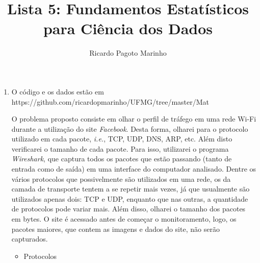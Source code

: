 \documentclass[11pt,a4paper]{book}
\title{Lista 5: Fundamentos Estatísticos para Ciência dos Dados}
\author{Ricardo Pagoto Marinho}
\begin{document}
\maketitle
	\begin{enumerate}
		\item

			O código e os dados estão em https://github.com/ricardopmarinho/UFMG/tree/master/Mat%
		
			O problema proposto consiste em olhar o perfil de tráfego em uma rede Wi-Fi durante a utilização do site \textit{Facebook}.
			Desta forma, olharei para o protocolo utilizado em cada pacote, \textit{i.e.}, TCP, UDP, DNS, ARP, etc.
			Além disto verificarei o tamanho de cada pacote.
			Para isso, utilizarei o programa \textit{Wireshark}, que captura todos os pacotes que estão passando (tanto de entrada como de saída) em uma interface do computador analisado.
			Dentre os vários protocolos que possivelmente são utilizados em uma rede, os da camada de transporte tentem a se repetir mais vezes, já que usualmente são utilizados apenas dois: TCP e UDP, enquanto que nas outras, a quantidade de protocolos pode variar mais.
			Além disso, olharei o tamanho dos pacotes em bytes.
			O site é acessado antes de começar o monitoramento, logo, os pacotes maiores, que contem as imagens e dados do site, não serão capturados.
			
			\begin{itemize}
				\item Protocolos
			

\end{itemize}
\end{enumerate}
\end{document}
